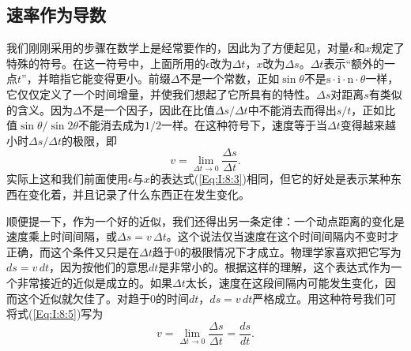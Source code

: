 \documentclass[12pt,oneside]{book}
\begin{document}
\begin{common-format}
\section{速率作为导数}
我们刚刚采用的步骤在数学上是经常要作的，因此为了方便起见，对量$\epsilon$和$x$规定了特殊的符号。在这一符号中，上面所用的$\epsilon$改为$\Delta t$，$x$改为$\Delta s$。$\Delta t$表示“额外的一点$t$”，并暗指它能变得更小。前缀$\Delta$不是一个常数，正如$\sin \theta$不是$\text{s}\cdot\text{i}\cdot\text{n}\cdot\theta$一样，它仅仅定义了一个时间增量，并使我们想起了它所具有的特性。$\Delta s$对距离$s$有类似的含义。因为$\Delta$不是一个因子，因此在比值$\Delta s/\Delta t$中不能消去而得出$s/t$，正如比值$\sin\theta/\sin2\theta$不能消去成为$1/2$一样。在这种符号下，速度等于当$\Delta t$变得越来越小时$\Delta s/\Delta t$的极限，即
\begin{equation}
\label{Eq:I:8:5}
v=\lim_{\Delta t\to0}\frac{\Delta s}{\Delta t}.
\end{equation}
实际上这和我们前面使用$\epsilon$与$x$的表达式(\ref{Eq:I:8:3})相同，但它的好处是表示某种东西在变化着，并且记录了什么东西正在发生变化。

顺便提一下，作为一个好的近似，我们还得出另一条定律：一个动点距离的变化是速度乘上时间间隔，或$\Delta s=v\,\Delta t$。这个说法仅当速度在这个时间间隔内不变时才正确，而这个条件又只是在$\Delta t$趋于0的极限情况下才成立。物理学家喜欢把它写为$ds=v\,dt$，因为按他们的意思$dt$是非常小的。根据这样的理解，这个表达式作为一个非常接近的近似是成立的。如果$\Delta t$太长，速度在这段间隔内可能发生变化，因而这个近似就欠佳了。对趋于0的时间$dt$，$ds=v\,dt$严格成立。用这种符号我们可将式(\ref{Eq:I:8:5})写为
\begin{equation*}
v=\lim_{\Delta t\to0}\frac{\Delta s}{\Delta t}=\frac{ds}{dt}.
\end{equation*}


\end{common-format}
\end{document}
